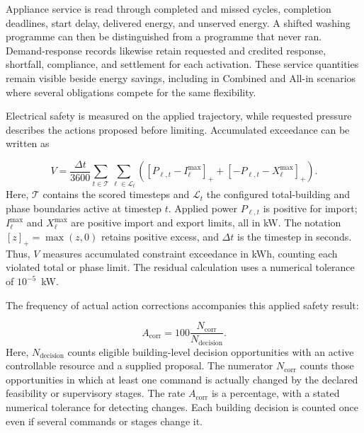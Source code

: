 Appliance service is read through completed and missed cycles, completion deadlines, start delay, delivered energy, and unserved energy. A shifted washing programme can then be distinguished from a programme that never ran. Demand-response records likewise retain requested and credited response, shortfall, compliance, and settlement for each activation. These service quantities remain visible beside energy savings, including in Combined and All-in scenarios where several obligations compete for the same flexibility.

Electrical safety is measured on the applied trajectory, while requested pressure describes the actions proposed before limiting. Accumulated exceedance can be written as
\begin{samepage}
\begin{equation}
V=\frac{\Delta t}{3600}\sum_{t\in\mathcal{T}}\sum_{\ell\in\mathcal{L}_t}
\left([P_{\ell,t}-I_{\ell}^{\max}]_+ +[-P_{\ell,t}-X_{\ell}^{\max}]_+\right).
\label{eq:sim-violation-energy}
\end{equation}
Here, $\mathcal{T}$ contains the scored timesteps and $\mathcal{L}_t$ the configured total-building and phase boundaries active at timestep $t$. Applied power $P_{\ell,t}$ is positive for import; $I_{\ell}^{\max}$ and $X_{\ell}^{\max}$ are positive import and export limits, all in kW. The notation $[z]_+=\max(z,0)$ retains positive excess, and $\Delta t$ is the timestep in seconds. Thus, $V$ measures accumulated constraint exceedance in kWh, counting each violated total or phase limit. The residual calculation uses a numerical tolerance of $10^{-5}$~kW.\par
\end{samepage}

The frequency of actual action corrections accompanies this applied safety result:
\begin{samepage}
\begin{equation}
 A_{\mathrm{corr}}=100\frac{N_{\mathrm{corr}}}{N_{\mathrm{decision}}}.
 \label{eq:sim-action-correction}
\end{equation}
Here, $N_{\mathrm{decision}}$ counts eligible building-level decision opportunities with an active controllable resource and a supplied proposal. The numerator $N_{\mathrm{corr}}$ counts those opportunities in which at least one command is actually changed by the declared feasibility or supervisory stages. The rate $A_{\mathrm{corr}}$ is a percentage, with a stated numerical tolerance for detecting changes. Each building decision is counted once even if several commands or stages change it.\par
\end{samepage}

